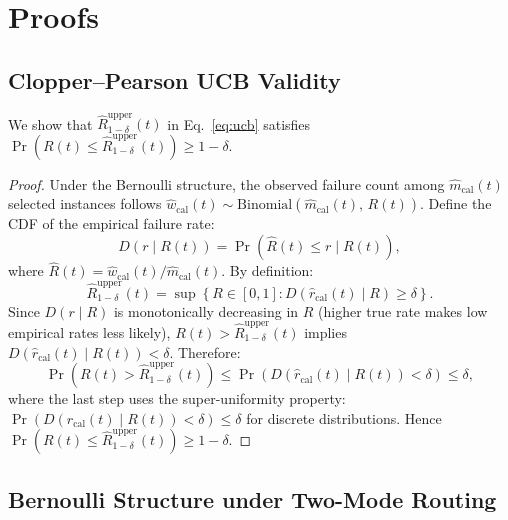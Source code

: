 
\appendix

\section{Proofs}
\label{app:proofs}


\subsection{Clopper--Pearson UCB Validity}
\label{app:proof_ucb}

We show that $\hat{R}^{\mathrm{upper}}_{1-\delta}(t)$ in Eq.~\eqref{eq:ucb} satisfies $\Pr(R(t) \leq \hat{R}^{\mathrm{upper}}_{1-\delta}(t)) \geq 1 - \delta$.

\begin{proof}
Under the Bernoulli structure, the observed failure count among $\hat{m}_{\mathrm{cal}}(t)$ selected instances follows $\hat{w}_{\mathrm{cal}}(t) \sim \mathrm{Binomial}(\hat{m}_{\mathrm{cal}}(t),\, R(t))$. Define the CDF of the empirical failure rate:
\begin{equation}
  D(r \mid R(t)) = \Pr\!\left(\hat{R}(t) \leq r \mid R(t)\right),
\end{equation}
where $\hat{R}(t) = \hat{w}_{\mathrm{cal}}(t) / \hat{m}_{\mathrm{cal}}(t)$. By definition:
\begin{equation}
  \hat{R}^{\mathrm{upper}}_{1-\delta}(t) = \sup\!\left\{R \in [0,1] : D(\hat{r}_{\mathrm{cal}}(t) \mid R) \geq \delta\right\}.
\end{equation}
Since $D(r \mid R)$ is monotonically decreasing in $R$ (higher true rate makes low empirical rates less likely), $R(t) > \hat{R}^{\mathrm{upper}}_{1-\delta}(t)$ implies $D(\hat{r}_{\mathrm{cal}}(t) \mid R(t)) < \delta$. Therefore:
\begin{equation}
  \Pr\!\left(R(t) > \hat{R}^{\mathrm{upper}}_{1-\delta}(t)\right)
  \leq \Pr\!\left(D(\hat{r}_{\mathrm{cal}}(t) \mid R(t)) < \delta\right)
  \leq \delta,
\end{equation}
where the last step uses the super-uniformity property: $\Pr(D(\hat{r}_{\mathrm{cal}}(t) \mid R(t)) < \delta) \leq \delta$ for discrete distributions. Hence $\Pr(R(t) \leq \hat{R}^{\mathrm{upper}}_{1-\delta}(t)) \geq 1 - \delta$.
\end{proof}

\subsection{Bernoulli Structure under Two-Mode Routing}
\label{app:proof_routing}

